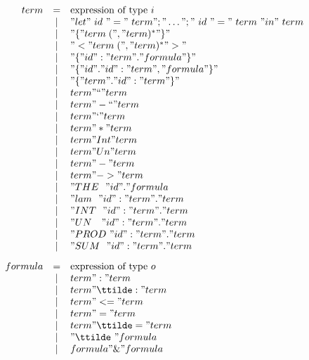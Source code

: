 \begin{figure} 
\dquotes
\[\begin{array}{rcl}
    term & = & \hbox{expression of type~$i$} \\
         & | & "let"~id~"="~term";"\dots";"~id~"="~term~"in"~term \\
         & | & "\{ " term\; ("," term)^* " \}" \\
         & | & "< "  term\; ("," term)^* " >"  \\
         & | & "\{ " id ":" term " . " formula " \}" \\
         & | & "\{ " id " . " id ":" term ", " formula " \}" \\
         & | & "\{ " term " . " id ":" term " \}" \\
         & | & term " `` " term \\
         & | & term " -`` " term \\
         & | & term " ` " term \\
         & | & term " * " term \\
         & | & term " Int " term \\
         & | & term " Un " term \\
         & | & term " - " term \\
         & | & term " -> " term \\
         & | & "THE~~"  id  " . " formula\\
         & | & "lam~~"  id ":" term " . " term \\
         & | & "INT~~"  id ":" term " . " term \\
         & | & "UN~~~"  id ":" term " . " term \\
         & | & "PROD~"  id ":" term " . " term \\
         & | & "SUM~~"  id ":" term " . " term \\[2ex]
 formula & = & \hbox{expression of type~$o$} \\
         & | & term " : " term \\
         & | & term " \ttilde: " term \\
         & | & term " <= " term \\
         & | & term " = " term \\
         & | & term " \ttilde= " term \\
         & | & "\ttilde\ " formula \\
         & | & formula " \& " formula \\

\end{array}\]
\end{figure}
